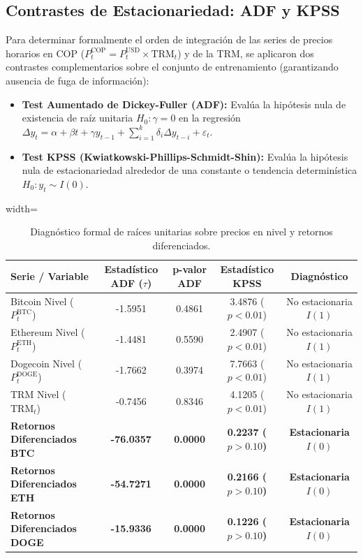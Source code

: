 \documentclass[12pt,letterpaper]{article}
\begin{document}
\subsection{Contrastes de Estacionariedad: ADF y KPSS}
Para determinar formalmente el orden de integración de las series de precios horarios en COP ($P_t^{\text{COP}} = P_t^{\text{USD}} \times \text{TRM}_t$) y de la TRM, se aplicaron dos contrastes complementarios sobre el conjunto de entrenamiento (garantizando ausencia de fuga de información):
\begin{itemize}
    \item \textbf{Test Aumentado de Dickey-Fuller (ADF):} Evalúa la hipótesis nula de existencia de raíz unitaria $H_0: \gamma = 0$ en la regresión $\Delta y_t = \alpha + \beta t + \gamma y_{t-1} + \sum_{i=1}^k \delta_i \Delta y_{t-i} + \varepsilon_t$.
    \item \textbf{Test KPSS (Kwiatkowski-Phillips-Schmidt-Shin):} Evalúa la hipótesis nula de estacionariedad alrededor de una constante o tendencia determinística $H_0: y_t \sim I(0)$.
\end{itemize}

\begin{table}[H]
\centering
\caption{Diagnóstico formal de raíces unitarias sobre precios en nivel y retornos diferenciados.}
\label{tab:stationarity}
\begin{adjustbox}{width=\textwidth}
\begin{tabular}{lcccc}
\toprule
\textbf{Serie / Variable} & \textbf{Estadístico ADF ($\tau$)} & \textbf{p-valor ADF} & \textbf{Estadístico KPSS} & \textbf{Diagnóstico} \\
\midrule
Bitcoin Nivel ($P_t^{\text{BTC}}$) & -1.5951 & 0.4861 & 3.4876 ($p < 0.01$) & No estacionaria $I(1)$ \\
Ethereum Nivel ($P_t^{\text{ETH}}$) & -1.4481 & 0.5590 & 2.4907 ($p < 0.01$) & No estacionaria $I(1)$ \\
Dogecoin Nivel ($P_t^{\text{DOGE}}$) & -1.7662 & 0.3974 & 7.7663 ($p < 0.01$) & No estacionaria $I(1)$ \\
TRM Nivel ($\text{TRM}_t$) & -0.7456 & 0.8346 & 4.1205 ($p < 0.01$) & No estacionaria $I(1)$ \\
\midrule
\textbf{Retornos Diferenciados BTC} & \textbf{-76.0357} & \textbf{0.0000} & \textbf{0.2237 ($p > 0.10$)} & \textbf{Estacionaria $I(0)$} \\
\textbf{Retornos Diferenciados ETH} & \textbf{-54.7271} & \textbf{0.0000} & \textbf{0.2166 ($p > 0.10$)} & \textbf{Estacionaria $I(0)$} \\
\textbf{Retornos Diferenciados DOGE} & \textbf{-15.9336} & \textbf{0.0000} & \textbf{0.1226 ($p > 0.10$)} & \textbf{Estacionaria $I(0)$} \\
\bottomrule
\end{tabular}
\end{adjustbox}
\end{table}
\end{document}
